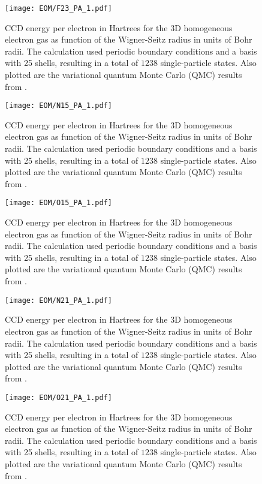 \documentclass[thesis.tex]{subfiles}
\begin{document}
\begin{figure}[h]
  \texttt{[image: EOM/F23\_PA\_1.pdf]}
  \caption{CCD energy per electron in Hartrees for the 3D homogeneous electron gas as function of the Wigner-Seitz radius in units of Bohr radii. The calculation used periodic boundary conditions and a basis with 25 shells, resulting in a total of $1238$ single-particle states. Also plotted are the variational quantum Monte Carlo (QMC) results from \cite{LOPEZ2006}.}
  \label{fig:QDground}
\end{figure}

\begin{figure}[h]
  \texttt{[image: EOM/N15\_PA\_1.pdf]}
  \caption{CCD energy per electron in Hartrees for the 3D homogeneous electron gas as function of the Wigner-Seitz radius in units of Bohr radii. The calculation used periodic boundary conditions and a basis with 25 shells, resulting in a total of $1238$ single-particle states. Also plotted are the variational quantum Monte Carlo (QMC) results from \cite{LOPEZ2006}.}
  \label{fig:QDground}
\end{figure}

\begin{figure}[h]
  \texttt{[image: EOM/O15\_PA\_1.pdf]}
  \caption{CCD energy per electron in Hartrees for the 3D homogeneous electron gas as function of the Wigner-Seitz radius in units of Bohr radii. The calculation used periodic boundary conditions and a basis with 25 shells, resulting in a total of $1238$ single-particle states. Also plotted are the variational quantum Monte Carlo (QMC) results from \cite{LOPEZ2006}.}
  \label{fig:QDground}
\end{figure}

\begin{figure}[h]
  \texttt{[image: EOM/N21\_PA\_1.pdf]}
  \caption{CCD energy per electron in Hartrees for the 3D homogeneous electron gas as function of the Wigner-Seitz radius in units of Bohr radii. The calculation used periodic boundary conditions and a basis with 25 shells, resulting in a total of $1238$ single-particle states. Also plotted are the variational quantum Monte Carlo (QMC) results from \cite{LOPEZ2006}.}
  \label{fig:QDground}
\end{figure}

\begin{figure}[h]
  \texttt{[image: EOM/O21\_PA\_1.pdf]}
  \caption{CCD energy per electron in Hartrees for the 3D homogeneous electron gas as function of the Wigner-Seitz radius in units of Bohr radii. The calculation used periodic boundary conditions and a basis with 25 shells, resulting in a total of $1238$ single-particle states. Also plotted are the variational quantum Monte Carlo (QMC) results from \cite{LOPEZ2006}.}
  \label{fig:QDground}
\end{figure}
\end{document}
